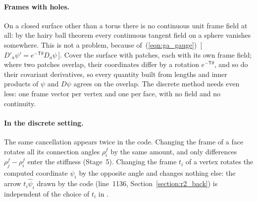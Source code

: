 \paragraph{Frames with holes.} On a closed surface other than a torus there is no continuous unit frame field at all: by the hairy ball theorem every continuous tangent field on a sphere vanishes somewhere. This is not a problem, because of~(\ref{eqn:ga_gauge})~[\,$D'_a\psi' = e^{-\mathsf T\theta}D_a\psi$\,]. Cover the surface with patches, each with its own frame field; where two patches overlap, their coordinates differ by a rotation $e^{-\mathsf T\theta}$, and so do their covariant derivatives, so every quantity built from lengths and inner products of $\psi$ and $D\psi$ agrees on the overlap. The discrete method needs even less: one frame vector per vertex and one per face, with no field and no continuity.

\paragraph{In the discrete setting.} The same cancellation appears twice in the code. Changing the frame of a face rotates all its connection angles $\rho_i^f$ by the same amount, and only differences $\rho_j^f - \rho_i^f$ enter the stiffness (Stage~5). Changing the frame $t_i$ of a vertex rotates the computed coordinate $\psi_i$ by the opposite angle and changes nothing else: the arrow $t_i \hat\psi_i$ drawn by the code (line~1136, Section~\ref{section:r2_back}) is independent of the choice of $t_i$ in .

